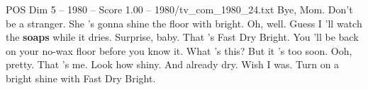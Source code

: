 \begin{textsample}{POS Dim 5 – 1980 – Score 1.00 – 1980/tv\_com\_1980\_24.txt}  \label{ex:f5_pos_016}
Bye, Mom.
Don't be a stranger.
She 's gonna shine the floor with bright.
Oh, well.
Guess I 'll watch the \textbf{soaps} while it dries.
Surprise, baby.
That 's Fast Dry Bright.
You 'll be back on your no-wax floor before you know it.
What 's this?
But it 's too soon.
Ooh, pretty.
That 's me.
Look how shiny.
And already dry.
Wish I was.
Turn on a bright shine with Fast Dry Bright.

\end{textsample}
